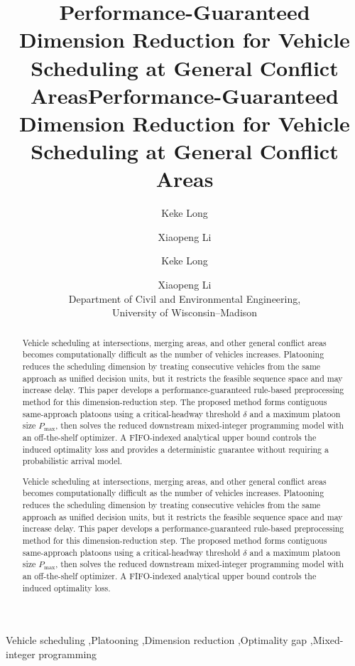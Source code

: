 \documentclass[preprint,12pt]{elsarticle}
\begin{document}
\ifelsevierclass
{}
\begin{frontmatter}

\title{Performance-Guaranteed Dimension Reduction for Vehicle Scheduling at General Conflict Areas}

\author[uw]{Keke Long}
\author[uw]{Xiaopeng Li}

\begin{abstract}
Vehicle scheduling at intersections, merging areas, and other general conflict areas becomes computationally difficult as the number of vehicles increases. Platooning reduces the scheduling dimension by treating consecutive vehicles from the same approach as unified decision units, but it restricts the feasible sequence space and may increase delay. This paper develops a performance-guaranteed rule-based preprocessing method for this dimension-reduction step. The proposed method forms contiguous same-approach platoons using a critical-headway threshold \(\delta\) and a maximum platoon size \(P_{\max}\), then solves the reduced downstream mixed-integer programming model with an off-the-shelf optimizer. A FIFO-indexed analytical upper bound controls the induced optimality loss and provides a deterministic guarantee without requiring a probabilistic arrival model.
\end{abstract}

\begin{keyword}
Vehicle scheduling \sep Platooning \sep Dimension reduction \sep Optimality gap \sep Mixed-integer programming
\end{keyword}

\end{frontmatter}
\else
\title{Performance-Guaranteed Dimension Reduction for Vehicle Scheduling at General Conflict Areas}
\author{Keke Long \and Xiaopeng Li\\
Department of Civil and Environmental Engineering,\\
University of Wisconsin--Madison}
\date{}
\maketitle
\begin{abstract}
Vehicle scheduling at intersections, merging areas, and other general conflict areas becomes computationally difficult as the number of vehicles increases. Platooning reduces the scheduling dimension by treating consecutive vehicles from the same approach as unified decision units, but it restricts the feasible sequence space and may increase delay. This paper develops a performance-guaranteed rule-based preprocessing method for this dimension-reduction step. The proposed method forms contiguous same-approach platoons using a critical-headway threshold \(\delta\) and a maximum platoon size \(P_{\max}\), then solves the reduced downstream mixed-integer programming model with an off-the-shelf optimizer. A FIFO-indexed analytical upper bound controls the induced optimality loss.
\end{abstract}
\end{document}
